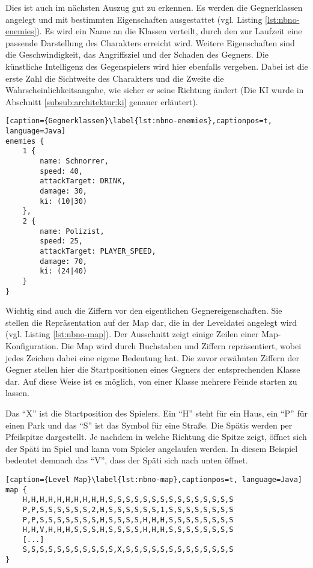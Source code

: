 Dies ist auch im nächsten Auszug gut zu erkennen.
Es werden die Gegnerklassen angelegt und mit bestimmten Eigenschaften ausgestattet (vgl. Listing \ref{lst:nbno-enemies}).
Es wird ein Name an die Klassen verteilt, durch den zur Laufzeit eine passende Darstellung des Charakters erreicht wird.
Weitere Eigenschaften sind die Geschwindigkeit, das Angriffsziel und der Schaden des Gegners.
Die künstliche Intelligenz des Gegenspielers wird hier ebenfalls vergeben.
Dabei ist die erste Zahl die Sichtweite des Charakters und die Zweite die Wahrscheinlichkeitsangabe, wie sicher er seine Richtung ändert (Die KI wurde in Abschnitt \ref{subsub:architektur:ki} genauer erläutert).

\begin{lstlisting}[caption={Gegnerklassen}\label{lst:nbno-enemies},captionpos=t, language=Java]
enemies {
    1 {
        name: Schnorrer,
        speed: 40,
        attackTarget: DRINK,
        damage: 30,
        ki: (10|30)
    },
    2 {
        name: Polizist,
        speed: 25,
        attackTarget: PLAYER_SPEED,
        damage: 70,
        ki: (24|40)
    }
}
\end{lstlisting}

Wichtig sind auch die Ziffern vor den eigentlichen Gegnereigenschaften. Sie stellen die Repräsentation auf der Map dar, die in der Leveldatei angelegt wird (vgl. Listing \ref{lst:nbno-map}). Der Ausschnitt zeigt einige Zeilen einer Map-Konfiguration. Die Map wird durch Buchstaben und Ziffern repräsentiert, wobei jedes Zeichen dabei eine eigene Bedeutung hat. Die zuvor erwähnten Ziffern der Gegner stellen hier die Startpositionen eines Gegners der entsprechenden Klasse dar. Auf diese Weise ist es möglich, von einer Klasse mehrere Feinde starten zu lassen.

Das ``X'' ist die Startposition des Spielers. Ein ``H'' steht für ein Haus, ein ``P'' für einen Park und das ``S'' ist das Symbol für eine Straße. Die Spätis werden per Pfeilspitze dargestellt. Je nachdem in welche Richtung die Spitze zeigt, öffnet sich der Späti im Spiel und kann vom Spieler angelaufen werden. In diesem Beispiel bedeutet demnach das ``V'', dass der Späti sich nach unten öffnet.

\begin{lstlisting}[caption={Level Map}\label{lst:nbno-map},captionpos=t, language=Java] 
map {
    H,H,H,H,H,H,H,H,H,H,S,S,S,S,S,S,S,S,S,S,S,S,S,S,S
    P,P,S,S,S,S,S,S,2,H,S,S,S,S,S,S,1,S,S,S,S,S,S,S,S
    P,P,S,S,S,S,S,S,S,H,S,S,S,S,H,H,H,S,S,S,S,S,S,S,S
    H,H,V,H,H,H,S,S,S,H,S,S,S,S,H,H,H,S,S,S,S,S,S,S,S
	[...]
    S,S,S,S,S,S,S,S,S,S,S,X,S,S,S,S,S,S,S,S,S,S,S,S,S
}
\end{lstlisting}

